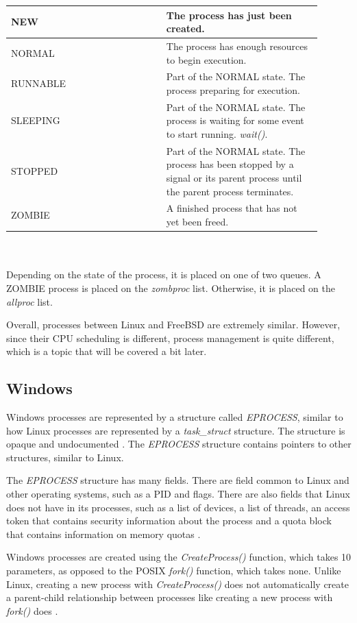 \documentclass[10pt,draftclsnofoot,onecolumn,journal,compsoc]{IEEEtran}
\begin{document}
\begin{tabular}{ | p{0.45\linewidth} | p{0.45\linewidth} | }
    \hline
    NEW & The process has just been created. \\ \hline
    NORMAL & The process has enough resources to begin execution. \\ \hline
    RUNNABLE & Part of the NORMAL state. The process preparing for execution. \\ \hline
    SLEEPING & Part of the NORMAL state. The process is waiting for some event to start running. \textit{wait()}. \\ \hline
    STOPPED & Part of the NORMAL state. The process has been stopped by a signal or its parent process until the parent process terminates. \\ \hline
    ZOMBIE & A finished process that has not yet been freed. \\ \hline
\end{tabular} \\ \\ 

Depending on the state of the process, it is placed on one of two queues. A ZOMBIE process is placed on the \textit{zombproc} list. Otherwise, it is placed on the \textit{allproc} list. 

Overall, processes between Linux and FreeBSD are extremely similar. However, since their CPU scheduling is different, process management is quite different, which is a topic that will be covered a bit later.


\subsection{Windows}
Windows processes are represented by a structure called \textit{EPROCESS}, similar to how Linux processes are represented by a \textit{task\_struct} structure. The structure is opaque and undocumented \cite{win_proc}. The \textit{EPROCESS} structure contains pointers to other structures, similar to Linux.

The \textit{EPROCESS} structure has many fields. There are field common to Linux and other operating systems, such as a PID and flags. There are also fields that Linux does not have in its processes, such as a list of devices, a list of threads, an access token that contains security information about the process and a quota block that contains information on memory quotas \cite{win_proc2}. 

Windows processes are created using the \textit{CreateProcess()} function, which takes 10 parameters, as opposed to the POSIX \textit{fork()} function, which takes none. Unlike Linux, creating a new process with \textit{CreateProcess()} does not automatically create a parent-child relationship between processes like creating a new process with \textit{fork()} does \cite{win_proc3}. 
\end{document}

